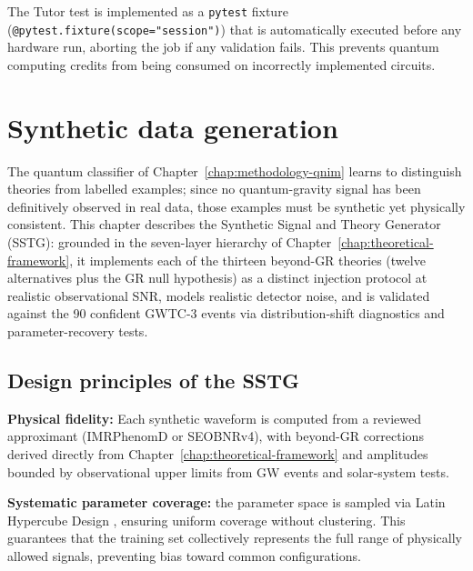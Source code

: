\documentclass[11pt,a4paper, english]{book}
\theoremstyle{plain}
\theoremstyle{definition}
\numberwithin{equation}{chapter}
\numberwithin{figure}{chapter}
\numberwithin{table}{chapter}
\begin{document}
The Tutor test is implemented as a \texttt{pytest} fixture
(\texttt{@pytest.fixture(scope="session")}) that is automatically executed
before any hardware run, aborting the job if any validation fails.  This
prevents quantum computing credits from being consumed on incorrectly
implemented circuits.



\chapter{Synthetic data generation}
\label{chap:synthetic}

The quantum classifier of Chapter~\ref{chap:methodology-qnim} learns to distinguish theories from labelled examples; since no quantum-gravity signal has been definitively observed in real data, those examples must be synthetic yet physically consistent. This chapter describes the Synthetic Signal and Theory Generator (SSTG): grounded in the seven-layer hierarchy of Chapter~\ref{chap:theoretical-framework}, it implements each of the thirteen beyond-GR theories (twelve alternatives plus the GR null hypothesis) as a distinct injection protocol at realistic observational SNR, models realistic detector noise, and is validated against the 90 confident GWTC-3 events via distribution-shift diagnostics and parameter-recovery tests.

\section{Design principles of the SSTG}
\label{sec:sstg-design}

\textbf{Physical fidelity:} Each synthetic waveform is computed from a reviewed approximant (IMRPhenomD or SEOBNRv4), with beyond-GR corrections derived directly from Chapter~\ref{chap:theoretical-framework} and amplitudes bounded by observational upper limits from GW events and solar-system tests.

\textbf{Systematic parameter coverage:} the parameter space is sampled via Latin Hypercube Design \cite{McKay_1979}, ensuring uniform coverage without clustering. This guarantees that the training set collectively represents the full range of physically allowed signals, preventing bias toward common configurations.
\end{document}
